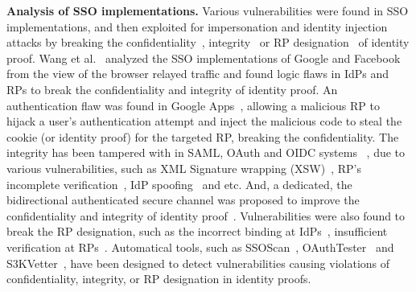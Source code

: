 \noindent\textbf{Analysis of SSO implementations.}
Various vulnerabilities were found in SSO implementations, and then exploited for impersonation and identity injection attacks by breaking the confidentiality~\cite{WangCW12,ccsSunB12,ArmandoCCCPS13,DiscoveringJCS,dimvaLiM16}, integrity~\cite{WangCW12,SomorovskyMSKJ12,WangZLG16,MainkaMS16, MainkaMSW17,dimvaLiM16} or RP designation~\cite{WangZLG16,MainkaMS16,MainkaMSW17,YangLCZ18,dimvaLiM16} of identity proof. Wang et al.~\cite{WangCW12} analyzed the SSO implementations of Google and Facebook from the view of the browser relayed traffic and found logic flaws in IdPs and RPs to break the confidentiality and integrity of identity proof.
An authentication flaw was found in Google Apps~\cite{ArmandoCCCPS13}, allowing a malicious RP to hijack a user's authentication attempt and inject the malicious code to steal the cookie (or identity proof) for the targeted RP, breaking the confidentiality.
The integrity has been tampered with in SAML, OAuth and OIDC systems ~\cite{SomorovskyMSKJ12,WangCW12,WangZLG16,MainkaMS16, MainkaMSW17},
due to various vulnerabilities, such as  XML Signature wrapping (XSW)~\cite{SomorovskyMSKJ12}, RP's incomplete verification~\cite{WangCW12,WangZLG16,MainkaMSW17}, IdP spoofing~\cite{MainkaMS16,MainkaMSW17} and etc.
And, a dedicated, the bidirectional authenticated secure channel was proposed to improve the confidentiality and integrity of identity proof~\cite{CaoSBKVC14}.
Vulnerabilities were also found to break the RP designation, such as the incorrect binding  at IdPs~\cite{YangLCZ18,WangZLG16}, insufficient verification at RPs~\cite{MainkaMS16,MainkaMSW17,YangLCZ18}.
Automatical tools, such as SSOScan~\cite{ZhouE14}, OAuthTester~\cite{YangLLZH16} and S3KVetter~\cite{YangLCZ18}, have been designed to detect vulnerabilities causing violations of confidentiality, integrity, or RP designation in identity proofs.


